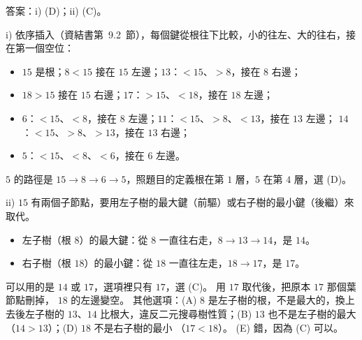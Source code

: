 \begin{pastsoln}
答案：i) (D)；ii) (C)。

i) 依序插入（資結書第~9.2~節），每個鍵從根往下比較，小的往左、大的往右，接在第一個空位：
\begin{itemize}
\item $15$ 是根；$8 < 15$ 接在 $15$ 左邊；$13$：$< 15$、$> 8$，接在 $8$ 右邊；
\item $18 > 15$ 接在 $15$ 右邊；$17$：$> 15$、$< 18$，接在 $18$ 左邊；
\item $6$：$< 15$、$< 8$，接在 $8$ 左邊；$11$：$< 15$、$> 8$、$< 13$，接在 $13$ 左邊；
$14$：$< 15$、$> 8$、$> 13$，接在 $13$ 右邊；
\item $5$：$< 15$、$< 8$、$< 6$，接在 $6$ 左邊。
\end{itemize}
\begin{center}
\end{center}
$5$ 的路徑是 $15 \to 8 \to 6 \to 5$，照題目的定義根在第 $1$ 層，$5$ 在第 $4$ 層，選 (D)。

ii) $15$ 有兩個子節點，要用左子樹的最大鍵（前驅）或右子樹的最小鍵（後繼）來取代。
\begin{itemize}
\item 左子樹（根 $8$）的最大鍵：從 $8$ 一直往右走，$8 \to 13 \to 14$，是 $14$。
\item 右子樹（根 $18$）的最小鍵：從 $18$ 一直往左走，$18 \to 17$，是 $17$。
\end{itemize}
可以用的是 $14$ 或 $17$，選項裡只有 $17$，選 (C)。 用 $17$ 取代後，把原本 $17$ 那個葉節點刪掉，
$18$ 的左邊變空。 其他選項：(A) $8$ 是左子樹的根，不是最大的，換上去後左子樹的 $13$、$14$
比根大，違反二元搜尋樹性質；(B) $13$ 也不是左子樹的最大（$14 > 13$）；(D) $18$ 不是右子樹的最小
（$17 < 18$）。 (E) 錯，因為 (C) 可以。
\end{pastsoln}
